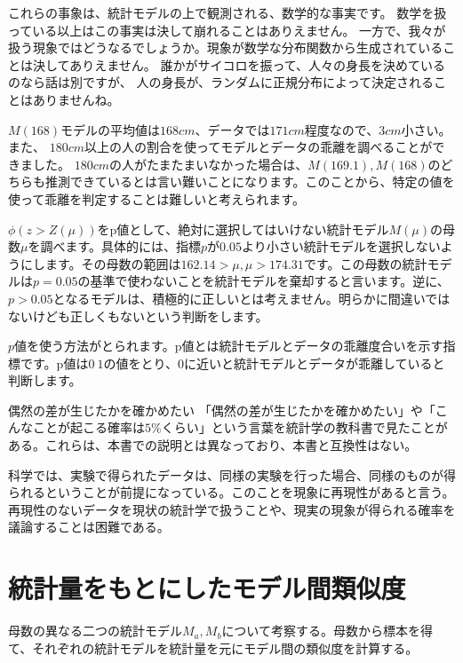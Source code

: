 これらの事象は、統計モデルの上で観測される、数学的な事実です。
数学を扱っている以上はこの事実は決して崩れることはありえません。
一方で、我々が扱う現象ではどうなるでしょうか。現象が数学な分布関数から生成されていることは決してありえません。
誰かがサイコロを振って、人々の身長を決めているのなら話は別ですが、
人の身長が、ランダムに正規分布によって決定されることはありませんね。

$M(168)$モデルの平均値は$168cm$、データでは$171cm$程度なので、$3cm$小さい。また、
$180cm$以上の人の割合を使ってモデルとデータの乖離を調べることができました。
$180cm$の人がたまたまいなかった場合は、$M(169.1),M(168)$のどちらも推測できているとは言い難いことになります。このことから、特定の値を使って乖離を判定することは難しいと考えられます。


$\phi(z>Z(\mu))を$p値として、絶対に選択してはいけない統計モデル$M(\mu)$の母数$\mu$を調べます。具体的には、指標$p$が$0.05$より小さい統計モデルを選択しないようにします。その母数の範囲は$162.14 >\mu, \mu > 174.31$です。この母数の統計モデルは$p=0.05$の基準で使わないことを統計モデルを棄却すると言います。逆に、$p>0.05$となるモデルは、積極的に正しいとは考えません。明らかに間違いではないけども正しくもないという判断をします。


$p$値を使う方法がとられます。p値とは統計モデルとデータの乖離度合いを示す指標です。p値は$0~1$の値をとり、$0$に近いと統計モデルとデータが乖離していると判断します。
\fi 




\begin{SMbox}{偶然の差が生じたかを確かめたい}
    「偶然の差が生じたかを確かめたい」や「こんなことが起こる確率は$5\%$くらい」という言葉を統計学の教科書で見たことがある。これらは、本書での説明とは異なっており、本書と互換性はない。
    
    科学では、実験で得られたデータは、同様の実験を行った場合、同様のものが得られるということが前提になっている。このことを現象に再現性があると言う。
    再現性のないデータを現状の統計学で扱うことや、現実の現象が得られる確率を議論することは困難である。
\end{SMbox}

    

\section{統計量をもとにしたモデル間類似度}
母数の異なる二つの統計モデル$M_a,M_b$について考察する。母数から標本を得て、それぞれの統計モデルを統計量を元にモデル間の類似度を計算する。

